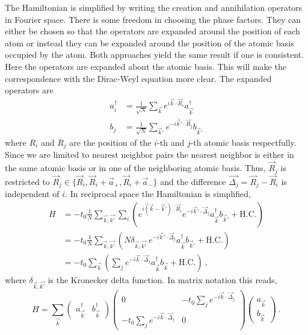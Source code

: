 The Hamiltonian is simplified by writing the creation and annihilation operators in Fourier space.
There is some freedom in choosing the phase factors.
They can either be chosen so that the operators are expanded around the position of each atom or instead they can be expanded around the position of the atomic basis occupied by the atom.
Both approaches yield the same result if one is consistent\cite{Bena2009}.
Here the operators are expanded about the atomic basis.
This will make the correspondence with the Dirac-Weyl equation more clear.
The expanded operators are
\begin{align}
	a_i^{\dagger}&=\frac{1}{\sqrt{N}}\sum_{\vec{k} } e^{ i \vec{k}  \cdot \vec{R}_i} a_{\vec{k} }^{\dagger} \nonumber \\
	b_j          &=\frac{1}{\sqrt{N}}\sum_{\vec{k}'} e^{-i \vec{k}' \cdot \vec{R}_j} b_{\vec{k}'} \label{eq:TB:FT} 
\end{align}
where $R_i$ and $R_j$ are the position of the $i$-th and $j$-th atomic basis respectfully.  
Since we are limited to nearest neighbor pairs the nearest neighbor is either in the same atomic basis or in one of the neighboring atomic basis.
Thus, $\vec{R}_j$ is restricted to $\vec{R}_j \in \{ \vec{R}_i,\vec{R}_i+\vec{a}_+,\vec{R}_i+\vec{a}_-\}$ and the difference $\vec{\Delta_j}=\vec{R}_j-\vec{R}_i$ is independent of $i$.
In reciprocal space the Hamiltonian is simplified,
\begin{align*}
	H&=-t_0 \frac{1}{N} \sum_{\vec{k},\vec{k'}}\sum_i \left( e^{i (\vec{k}-\vec{k}') \cdot \vec{R}_i}
		e^{-i \vec{k}' \cdot \vec{\Delta}_j}
		a^{\dagger}_{\vec{k}} b_{\vec{k}'} + \text{H.C.} \right)\\
	 &=-t_0 \frac{1}{N} \sum_{\vec{k},\vec{k'}} \left( N \delta_{\vec{k},\vec{k'}} \
	 	e^{-i \vec{k}' \cdot \vec{\Delta}_j}
		a^{\dagger}_{\vec{k}} b_{\vec{k}'} + \text{H.C.}\right)\\ 
	 &=-t_0 \sum_{\vec{k}}\left( \sum_{j} e^{-i \vec{k} \cdot \vec{\Delta}_j} a^{\dagger}_{\vec{k}} b_{\vec{k}} + \text{H.C.} \right) \ ,
\end{align*}
where $\delta_{\vec{k},\vec{k'}}$ is the Kronecker delta function.
In matrix notation this reads,
\begin{equation}
	H=\sum_{\vec k} 
		\left( \begin{array}{cc} a^{\dagger}_{\vec{k}} & b^{\dagger}_{\vec{k}} \end{array} \right)
		\left( \begin{array}{cc}
			0              & -t_0 \sum_{j} e^{-i \vec{k} \cdot \vec{\Delta}_j} \\
			-t_0 \sum_{j} e^{-i \vec{k} \cdot \vec{\Delta}_j} & 0               \end{array} \right)
		\left( \begin{array}{c } a_{\vec{k}}           \\ b_{\vec{k}}          \end{array} \right) \ .
	\label{eq:TB:RealSpace}
\end{equation}
